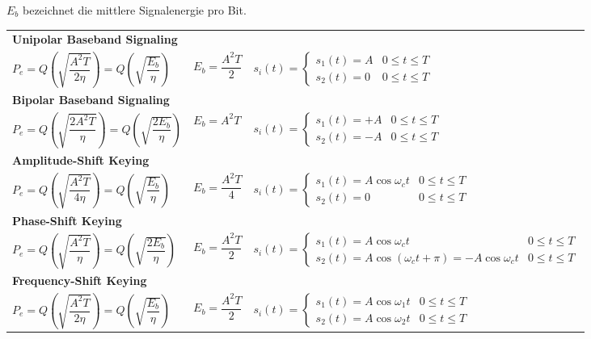 \label{09_binary_signals_error}
\small{$E_b$ bezeichnet die mittlere Signalenergie pro Bit.}\\
\renewcommand{\arraystretch}{2.5}
	\begin{tabular}{ p{6cm} p{2.5cm} p{9cm} }		
		\multicolumn{3}{l}{\textbf{Unipolar Baseband Signaling}} \\
		$ P_e = Q\left(\sqrt{\dfrac{A^2 T}{2 \eta}}\right) = Q\left(\sqrt{\dfrac{E_b}{\eta}}\right) $
		& $ E_b = \dfrac{A^2 T}{2} $
		& $ s_i(t) = \begin{cases}
		     s_1(t) = A & 0 \leq t \leq T \\       
		     s_2(t) = 0 & 0 \leq t \leq T
		   \end{cases}$ \\  

		\multicolumn{3}{l}{\textbf{Bipolar Baseband Signaling}} \\
		$ P_e = Q\left(\sqrt{\dfrac{2 A^2 T}{\eta}}\right) = Q\left(\sqrt{\dfrac{2 E_b}{\eta}}\right) $
		& $ E_b = A^2 T $
		& $ s_i(t) = \begin{cases}
 		     s_1(t) = +A & 0 \leq t \leq T \\       
 		     s_2(t) = -A & 0 \leq t \leq T
 		   \end{cases} $ \\

		\multicolumn{3}{l}{\textbf{Amplitude-Shift Keying}} \\
		$ P_e = Q\left(\sqrt{\dfrac{A^2 T}{4 \eta}}\right) = Q\left(\sqrt{\dfrac{E_b}{\eta}}\right) $
		& $ E_b = \dfrac{A^2 T}{4} $
		& $ s_i(t) = \begin{cases}
 		     s_1(t) = A \cos{\omega_c t} & 0 \leq t \leq T \\       
 		     s_2(t) = 0 & 0 \leq t \leq T
 		   \end{cases} $ \\

		\multicolumn{3}{l}{\textbf{Phase-Shift Keying}} \\
		$ P_e = Q\left(\sqrt{\dfrac{A^2 T}{\eta}}\right) = Q\left(\sqrt{\dfrac{2 E_b}{\eta}}\right)  $
		& $ E_b = \dfrac{A^2 T}{2} $
		& $ s_i(t) = \begin{cases}
 		     s_1(t) = A \cos{\omega_c t} & 0 \leq t \leq T \\       
 		     s_2(t) = A \cos{(\omega_c t + \pi)} = - A \cos{\omega_c t} & 0 \leq t \leq T
 		   \end{cases} $ \\

		\multicolumn{3}{l}{\textbf{Frequency-Shift Keying}} \\
		$ P_e = Q\left(\sqrt{\dfrac{A^2 T}{2 \eta}}\right) = Q\left(\sqrt{\dfrac{E_b}{\eta}}\right) $
		& $ E_b = \dfrac{A^2 T}{2} $
		& $ s_i(t) = \begin{cases}
 		     s_1(t) = A \cos{\omega_1 t} & 0 \leq t \leq T \\       
 		     s_2(t) = A \cos{\omega_2 t} & 0 \leq t \leq T
 		   \end{cases}$ \\

 	\end{tabular}
	\renewcommand{\arraystretch}{1}